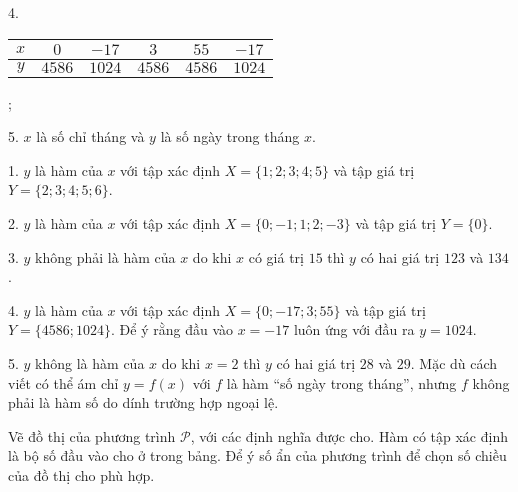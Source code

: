 \documentclass[a4paper, titlepage, openany]{book}
\newcounter{exercise}
\newcounter{solution}
\newcommand\dblquote[1]{\textquotedblleft #1\textquotedblright}
\begin{document}
4.
\begin{tabular}{|c|c|c|c|c|c|}
   \hline
   $x$ & $0$ & $-17$ & $3$ & $55$ & $-17$ \\
   \hline
   $y$ & $4586$ & $1024$ & $4586$ & $4586$ & $1024$ \\
   \hline
\end{tabular};

5. $x$ là số chỉ tháng và $y$ là số ngày trong tháng $x$.

\solution

1. $y$ là hàm của $x$ với tập xác định $X = \{1; 2; 3; 4; 5\}$ và tập giá trị $Y = \{2; 3; 4; 5; 6\}$.

2. $y$ là hàm của $x$ với tập xác định $X = \{0; -1; 1; 2; -3\}$ và tập giá trị $Y = \{0\}$.

3. $y$ không phải là hàm của $x$ do khi $x$ có giá trị $15$ thì $y$ có hai giá trị $123$ và $134$.

4. $y$ là hàm của $x$ với tập xác định $X = \{0; -17; 3; 55\}$ và tập giá trị $Y = \{4586; 1024\}$. Để ý rằng đầu vào $x=-17$ luôn ứng với đầu ra $y = 1024$.

5. $y$ không là hàm của $x$ do khi $x = 2$ thì $y$ có hai giá trị $28$ và $29$. Mặc dù cách viết có thể ám chỉ $y=f(x)$ với $f$ là hàm \dblquote{số ngày trong tháng}, nhưng $f$ không phải là hàm số do dính trường hợp ngoại lệ.

\exercise[intropt] Vẽ đồ thị của phương trình $\mathcal{P}$, với các định nghĩa được cho. Hàm có tập xác định là bộ số đầu vào cho ở trong bảng. Để ý số ẩn của phương trình để chọn số chiều của đồ thị cho phù hợp.
\end{document}
